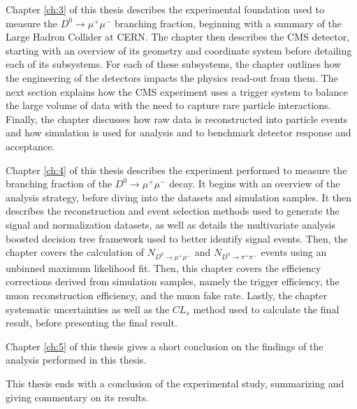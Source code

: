 Chapter \ref{ch:3} of this thesis describes the experimental foundation used to measure the $D^0 \to \mu^+ \mu^-$ branching fraction, beginning with a summary of the Large Hadron Collider at CERN. The chapter then describes the CMS detector, starting with an overview of its geometry and coordinate system before detailing each of its subsystems. For each of these subsystems, the chapter outlines how the engineering of the detectors impacts the physics read-out from them. The next section explains how the CMS experiment uses a trigger system to balance the large volume of data with the need to capture rare particle interactions. Finally, the chapter discusses how raw data is reconstructed into particle events and how simulation is used for analysis and to benchmark detector response and acceptance.

Chapter \ref{ch:4} of this thesis describes the experiment performed to measure the branching fraction of the $D^0 \to \mu^+ \mu^-$ decay. It begins with an overview of the analysis strategy, before diving into the datasets and simulation samples. It then describes the reconstruction and event selection methods used to generate the signal and normalization datasets, as well as details the multivariate analysis boosted decision tree framework used to better identify signal events. Then, the chapter covers the calculation of $N_{D^0 \to \mu^+ \mu^-}$ and $N_{D^0 \to \pi^+ \pi^-}$ events using an unbinned maximum likelihood fit. Then, this chapter covers the efficiency corrections derived from simulation samples, namely the trigger efficiency, the muon reconstruction efficiency, and the muon fake rate. Lastly, the chapter systematic uncertainties as well as the $CL_s$ method used to calculate the final result, before presenting the final result. 

Chapter \ref{ch:5} of this thesis gives a short conclusion on the findings of the analysis performed in this thesis.

This thesis ends with a conclusion of the experimental study, summarizing and giving commentary on its results. 

